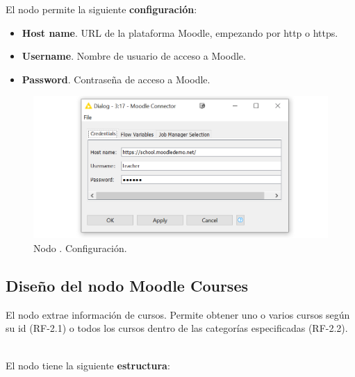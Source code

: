 El nodo permite la siguiente \textbf{configuración}: 

\begin{itemize}
   \item \textbf{Host name}. URL de la plataforma Moodle, empezando por http o https. 
   \item \textbf{Username}. Nombre de usuario de acceso a Moodle.
   \item \textbf{Password}. Contraseña de acceso a Moodle.
\end{itemize}

\begin{figure}[!h]
	\centering
	\includegraphics[width=1\textwidth]{img/nodes_moodle_connector_settings.png}
	\caption{Nodo . Configuración.}
	\label{fig:moodleconnector_settings}
\end{figure}
\FloatBarrier

\hphantom{ }

\newpage    
\subsection{Diseño del nodo Moodle Courses}

El nodo  extrae información de cursos. Permite obtener uno o varios cursos según su id (RF-2.1) o todos 
los cursos dentro de las categorías especificadas (RF-2.2). 
\

El nodo tiene la siguiente \textbf{estructura}:

